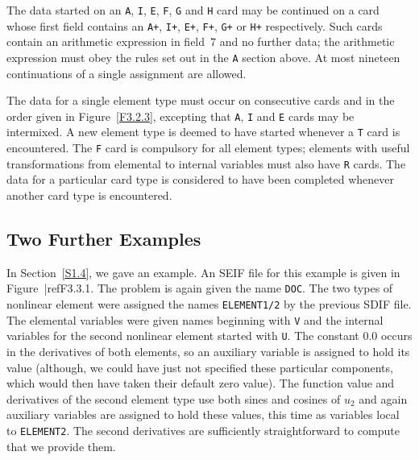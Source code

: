 \documentclass[a4paper]{article}
\begin{document}
The data started on an {\tt A}, {\tt I}, {\tt E}, {\tt F},  {\tt G} and
{\tt H} card
may be  continued on a card whose  first field contains an
{\tt A+},  {\tt I+},  {\tt  E+},   {\tt  F+}, {\tt G+}  or  {\tt   H+}
respectively.
Such cards  contain an arithmetic expression in field~7
and no further data; the arithmetic expression must obey the rules set
out in the {\tt A} section above.  At most nineteen continuations of a
single assignment are allowed.

The data for a single element type
must occur on consecutive cards and
in the order given  in Figure~\ref{F3.2.3},  excepting that  {\tt  A},
{\tt  I} and {\tt  E}
cards
may be intermixed.  A new element type
is deemed to have started  whenever a {\tt T}
card is  encountered.  The {\tt F}
card is  compulsory for  all   element   types;
elements  with  useful
transformations from elemental to internal  variables must  also  have
{\tt R}
cards.
The data for a particular card type is considered to have been
completed whenever another card type is encountered.

\subsection{\label{S3.3}Two Further Examples}

In Section~\ref{S1.4},   we gave an example. An   SEIF   file for this
example is given  in Figure~|ref{F3.3.1}.  The  problem is again given
the name {\tt DOC}.  The two types of nonlinear  element were assigned
the names {\tt ELEMENT1/2}  by the previous SDIF  file.  The elemental
variables were  given names beginning  with {\tt V}  and the  internal
variables for the second nonlinear element
started with {\tt U}.  The constant 0.0 occurs in the derivatives
of  both elements,   so  an
auxiliary variable is assigned  to hold its  value (although, we could
have just not specified these particular components,  which would then
have taken  their  default  zero  value).  The function    value   and
derivatives of the second element type
use  both sines and  cosines of
$u_2$ and again auxiliary variables are assigned to hold these values,
this  time  as    variables local  to  {\tt  ELEMENT2}.    The  second
derivatives  are  sufficiently   straightforward   to  compute that we
provide them.
\end{document}
